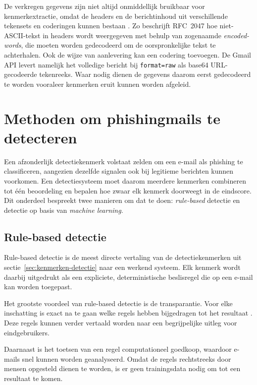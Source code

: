 De verkregen gegevens zijn niet altijd onmiddellijk bruikbaar voor kenmerkextractie, omdat de headers en de berichtinhoud uit verschillende tekensets en coderingen kunnen bestaan \autocite{Koide2025}. Zo beschrijft RFC~2047 \autocite{Moore1996} hoe niet-ASCII-tekst in headers wordt weergegeven met behulp van zogenaamde \emph{encoded-words}, die moeten worden gedecodeerd om de oorspronkelijke tekst te achterhalen. Ook de wijze van aanlevering kan een codering toevoegen. De Gmail API levert namelijk het volledige bericht bij \texttt{format=raw} als base64 URL-gecodeerde tekenreeks. Waar nodig dienen de gegevens daarom eerst gedecodeerd te worden vooraleer kenmerken eruit kunnen worden afgeleid.

\section{Methoden om phishingmails te detecteren}%
\label{sec:methoden-detectie}

Een afzonderlijk detectiekenmerk volstaat zelden om een e-mail als phishing te classificeren, aangezien dezelfde signalen ook bij legitieme berichten kunnen voorkomen. Een detectiesysteem moet daarom meerdere kenmerken combineren tot één beoordeling en bepalen hoe zwaar elk kenmerk doorweegt in de eindscore. Dit onderdeel bespreekt twee manieren om dat te doen: \emph{rule-based} detectie en detectie op basis van \emph{machine learning}.

\subsection{Rule-based detectie}%
\label{subsec:rulebased-detectie}

Rule-based detectie is de meest directe vertaling van de detectiekenmerken uit sectie~\ref{sec:kenmerken-detectie} naar een werkend systeem. Elk kenmerk wordt daarbij uitgedrukt als een expliciete, deterministische beslisregel die op een e-mail kan worden toegepast.

Het grootste voordeel van rule-based detectie is de transparantie. Voor elke inschatting is exact na te gaan welke regels hebben bijgedragen tot het resultaat \autocite{Rudin2019}. Deze regels kunnen verder vertaald worden naar een begrijpelijke uitleg voor eindgebruikers.

Daarnaast is het toetsen van een regel computationeel goedkoop, waardoor e-mails snel kunnen worden geanalyseerd. Omdat de regels rechtstreeks door mensen opgesteld dienen te worden, is er geen trainingsdata nodig om tot een resultaat te komen.

